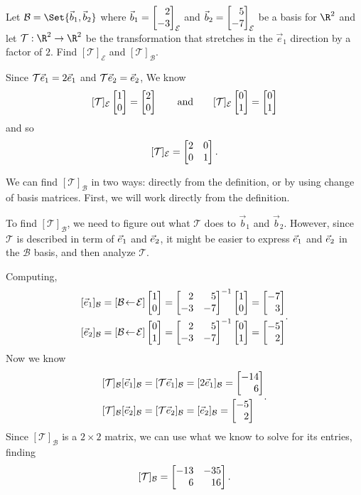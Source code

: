 \begin{example}
	Let $\mathcal B=\Set{\vec b_1,\vec b_2}$ where $\vec b_1=\mat{2\\-3}_{\mathcal E}$ and $\vec b_2=\mat{5\\-7}_{\mathcal E}$
	be a basis for $\R^2$ and let $\mathcal T:\R^2\to\R^2$ be the transformation that stretches in the $\vec e_1$ direction 
	by a factor of $2$. Find $[\mathcal T]_{\mathcal E}$ and $[\mathcal T]_{\mathcal B}$.

	Since $\mathcal T{\vec e_1}=2{\vec e_1}$ and $\mathcal T{\vec e_2}={\vec e_2}$, We know
	\[
		[\mathcal T]_{\mathcal E}\mat{1\\0}=\mat{2\\0}\qquad\text{and}\qquad
		[\mathcal T]_{\mathcal E}\mat{0\\1}=\mat{0\\1}
	\]
	and so
	\[
		[\mathcal T]_{\mathcal E}=\mat{2&0\\0&1}.
	\]

	We can find $[\mathcal T]_{\mathcal B}$ in two ways: directly from the definition, or by using change of basis matrices.
	First, we will work directly from the definition.

	To find $[\mathcal T]_{\mathcal B}$, we need to figure out what $\mathcal T$ does to $\vec b_1$ and $\vec b_2$.
	However, since $\mathcal T$ is described in term of ${\vec e_1}$ and ${\vec e_2}$, it might be easier to express ${\vec e_1}$ and
	${\vec e_2}$ in the $\mathcal B$ basis, and then analyze $\mathcal T$.

	Computing,
	\[
		\begin{aligned}
			[\xhat]_{\mathcal B} &= \BasisChange{\mathcal E}{\mathcal B}\mat{1\\0} = \mat{2&5\\-3&-7}^{-1}\mat{1\\0}=\mat{-7\\3}\\
			[\yhat]_{\mathcal B} &= \BasisChange{\mathcal E}{\mathcal B}\mat{0\\1} = \mat{2&5\\-3&-7}^{-1}\mat{0\\1}=\mat{-5\\2}
		\end{aligned}.
	\]
	Now we know
	\[
		\begin{aligned}
			[\mathcal T]_{\mathcal B}[\xhat]_{\mathcal B}&=[\mathcal T\xhat]_{\mathcal B}=[2\xhat]_{\mathcal B}=\mat{-14\\6}\\
			[\mathcal T]_{\mathcal B}[\yhat]_{\mathcal B}&=[\mathcal T\yhat]_{\mathcal B}=[\yhat]_{\mathcal B}=\mat{-5\\2}
		\end{aligned}.
	\]
	Since $[\mathcal T]_{\mathcal B}$ is a $2\times 2$ matrix, we can use what we know to solve for its entries, finding
	\[
		[\mathcal T]_{\mathcal B}=\mat{-13&-35\\6&16}.
	\]


\end{example}
